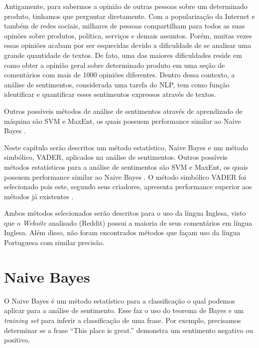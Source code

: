 Antigamente, para sabermos a opinião de outras pessoas sobre um
determinado produto, tinhamos que perguntar diretamente. Com a
popularização da Internet e também de redes sociais, milhares de pessoas
compartilham para todos as suas opinões sobre produtos, política, serviços e
demais assuntos. Porém, muitas vezes essas opiniões acabam
por ser esquecidas devido a dificuldade de se analisar uma grande quantidade de
textos. De fato, uma das maiores dificuldades reside em como obter a opinião
geral sobre determinado produto em uma seção de comentários com mais de 1000
opiniões diferentes. Dentro dessa contexto, a análise de sentimentos,
considerada uma tarefa do \ac{NLP}, tem como função identificar e quantificar esses sentimentos expressos através de textos.

Outros possíveis métodos de análise de sentimentos através de aprendizado de
máquina são \ac{SVM} e \ac{MaxEnt}, os quais possuem
performance similar ao Naive Bayes \cite{domingos97naivebayes}.


Neste capítulo serão descritos um método estatístico, Naive Bayes e um método
simbólico, \ac{VADER}, aplicados na análise de sentimentos. Outros possíveis
métodos estatísticos para a análise de sentimentos são \ac{SVM} e \ac{MaxEnt},
os quais possuem performance similar ao Naive Bayes \cite{Pang:2002:TUS:1118693.1118704}. O método simbólico
\ac{VADER} foi selecionado pois este, segundo seus criadores, apresenta
performance superior aos métodos já existentes \cite{conf/icwsm/HuttoG14}.

Ambos métodos selecionados serão descritos para o uso da língua Inglesa,
visto que o \textit{Website} analisado (Reddit) possui a maioria de seus
comentários em língua Inglesa. Além disso, não foram encontrados métodos que
façam uso da língua Portuguesa com similar precisão.





\section{Naive Bayes}

O Naive Bayes é um método estatístico para a classificação o qual podemos
aplicar para a análise de sentimento. Esse faz o uso do teorema de Bayes e um
\textit{training set} para inferir a classificação de uma frase. Por exemplo,
precisamos determinar se a frase ``This place is great.'' demonstra um
sentimento negativo ou positivo. 

